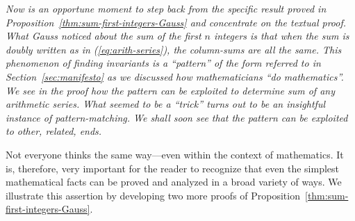\medskip

%
{\em Now is an opportune moment to step back from the specific result
  proved in Proposition~\ref{thm:sum-first-integers-Gauss} and
  concentrate on the textual proof.  What Gauss noticed about the sum
  of the first $n$ integers is that when the sum is doubly written as
  in (\ref{eq:arith-series}), the column-sums are all the same.  This
  phenomenon of {\em finding invariants} is a ``pattern'' of the form
  referred to in Section~\ref{sec:manifesto} as we discussed how
  mathematicians ``do mathematics''.  We see in the proof how the
  pattern can be exploited to determine sum of any arithmetic series.
  {\em What seemed to be a ``trick'' turns out to be an insightful
    instance of pattern-matching.}  We shall soon see that the pattern
  can be exploited to other, related, ends.}

\medskip

Not everyone thinks the same way---even within the context of
mathematics.  It is, therefore, very important for the reader to
recognize that even the simplest mathematical facts can be proved and
analyzed in a broad variety of ways.  We illustrate this assertion by
developing two more proofs of
Proposition~\ref{thm:sum-first-integers-Gauss}.

